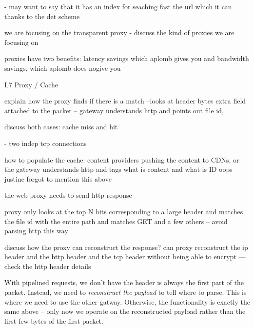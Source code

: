 - may want to say that it has an index for seaching fast the url which it can thanks to the det scheme


we are focusing on the transparent proxy
- discuss the kind of proxies we are focusing on

proxies have two benefits: latency savings which aplomb gives you 
and bandwidth savings, which aplomb does nogive you
 
L7 Proxy / Cache

explain how the proxy finds if there is  a match --looks at header bytes
extra field attached to the packet -- gateway understands http and points out file id, 

discuss both cases: cache miss and hit

- two indep tcp connections 

how to populate the cache: content providers pushing the content to CDNs, or the gateway understands
http and tags what is content and what is ID
oops justine forgot to mention this above

the web proxy needs to send http response 

proxy only looks at the top N bits corresponding to a large header and matches the file id with the entire path
and matches GET and a few others -- avoid parsing http this way


discuss how the proxy can reconstruct the response?
can proxy reconstruct the ip header and the http header  and the tcp header without being able to encrypt
--- check the http header details

With pipelined requests, we don't have the header is always the first part of the packet. Instead, we need to {\it reconstruct the payload} to tell where to parse. This is where we need to use the other gatway. Otherwise, the functionality is exactly the same above -- only now we operate on the reconstructed payload rather than the first few bytes of the first packet.


